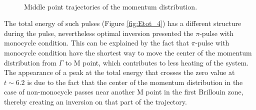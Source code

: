 \begin{figure}[h!]
 \\
\caption{Middle point trajectories of the momentum distribution.}
\label{fig:Pulse_p_4}
\end{figure}

The total energy of such pulses (Figure \ref{fig:Etot_4}) has a different structure during the pulse, nevertheless optimal inversion presented the $\pi$-pulse with monocycle condition. This can be explained by the fact that $\pi$-pulse with monocycle condition have the shortest way to move the center of the momentum distribution from $\Gamma$ to M point, which contributes to less heating of the system. The appearance of a peak at the total energy that crosses the zero value at $t \sim 6.2$ is due to the fact that the center of the momentum distribution in the case of non-monocycle passes near another M point in the first Brillouin zone, thereby creating an inversion on that part of the trajectory.


